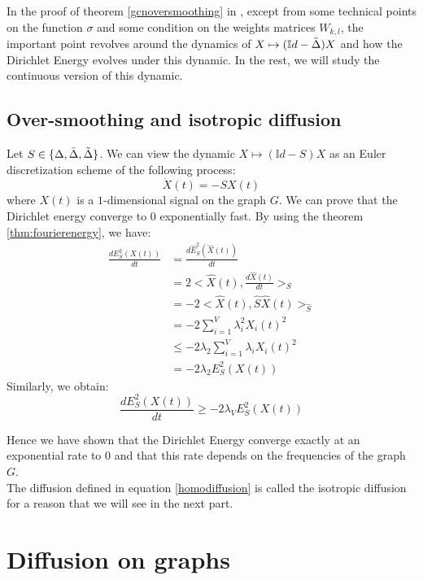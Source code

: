 \documentclass[12pt]{article}
\begin{document}
In the proof of theorem \ref{gcnoversmoothing} in , except from some technical points on the function $\sigma$ and some condition on the weights matrices $W_{k,l}$, the important point revolves around the dynamics of $X \mapsto (\mathbb{I}d-\Tilde{\Delta})X$ and how the Dirichlet Energy evolves under this dynamic. In the rest, we will study the continuous version of this dynamic. 

\subsection{Over-smoothing and isotropic diffusion }
Let $S \in \{\Delta, \bar{\Delta}, \Tilde{\Delta}\}$. We can view the dynamic $X \mapsto (\mathbb{I}d-S)X$ as an Euler discretization scheme of the following process:
\begin{equation}\label{homodiffusion}
    \dot{X}(t) = -S X(t)
\end{equation}
where $X(t)$ is a $1$-dimensional signal on the graph $G$. We can prove that the Dirichlet energy converge to 0 exponentially fast. By using the theorem \ref{thm:fourierenergy}, we have:
\begin{align*}
    \frac{d E_S^2(X(t))}{dt} &= \frac{d \widehat{E}_S^2(\widehat{X}(t))}{dt}\\
     &= 2<\widehat{X}(t),\frac{d\widehat{X}(t)}{dt}>_{S}\\
                           &= -2<\widehat{X}(t), \widehat{S} \widehat{X}(t)>_{\widehat{S}}\\
                           &= -2\sum_{i=1}^V \lambda_i^2 X_i(t)^2\\
                           &\leq -2 \lambda_2 \sum_{i=1}^V \lambda_i X_i(t)^2\\
                           &= -2 \lambda_2 E_S^2(X(t))
\end{align*}
Similarly, we obtain:
$$ \frac{d E_S^2(X(t))}{dt} \geq -2  \lambda_V E_S^2(X(t))$$

Hence we have shown that the Dirichlet Energy converge exactly at an exponential rate to $0$ and that this rate depends on the frequencies of the graph $G$.\\

The diffusion defined in equation \ref{homodiffusion} is called the isotropic diffusion for a reason that we will see in the next part.

\newpage
\section{Diffusion on graphs}
\end{document}
